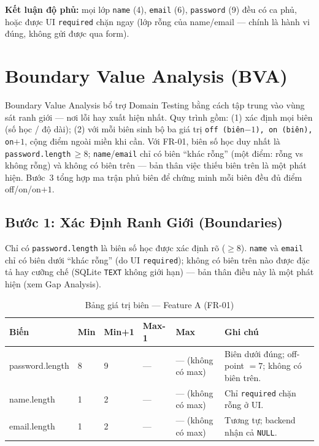 \documentclass[12pt, a4paper]{report}
\begin{document}
\noindent\textbf{Kết luận độ phủ:} mọi lớp \texttt{name} (4), \texttt{email} (6), \texttt{password}
(9) đều có ca phủ, hoặc được UI \texttt{required} chặn ngay (lớp rỗng của name/email --- chính là
hành vi đúng, không gửi được qua form).

\section{Boundary Value Analysis (BVA)}

Boundary Value Analysis bổ trợ Domain Testing bằng cách tập trung vào vùng sát ranh giới
--- nơi lỗi hay xuất hiện nhất. Quy trình gồm: (1) xác định mọi biên (số học /
độ dài); (2) với mỗi biên sinh bộ ba giá trị \texttt{off (biên$-1$), on (biên), on$+1$}, cộng
điểm ngoài miền khi cần. Với FR-01, biên số học duy nhất là \texttt{password.length}$\,\ge 8$;
\texttt{name}/\texttt{email} chỉ có biên ``khác rỗng'' (một điểm: rỗng vs không rỗng) và
không có biên trên --- bản thân việc thiếu biên trên là một phát hiện. Bước~3 tổng hợp ma
trận phủ biên để chứng minh mỗi biên đều đủ điểm off/on/on$+1$.

\subsection{Bước 1: Xác Định Ranh Giới (Boundaries)}
Chỉ có \texttt{password.length} là biên số học được xác định rõ ($\ge 8$). \texttt{name} và
\texttt{email} chỉ có biên dưới ``khác rỗng'' (do UI \texttt{required}); không có biên
trên nào được đặc tả hay cưỡng chế (SQLite \texttt{TEXT} không giới hạn) — bản thân điều này
là một phát hiện (xem Gap Analysis).

\begin{table}[H]
    \centering
    \caption{Bảng giá trị biên — Feature A (FR-01)}
    \begin{tabularx}{\linewidth}{L{3cm} C{1.6cm} C{1.6cm} C{1.8cm} C{2.4cm} X}
        \toprule
        \textbf{Biến} & \textbf{Min} & \textbf{Min+1} & \textbf{Max-1} & \textbf{Max} & \textbf{Ghi chú} \\
        \midrule
        password.length & 8 & 9 & --- & --- (không có max) & Biên dưới đúng; off-point $=7$; không có biên trên. \\
        name.length     & 1 & 2 & --- & --- (không có max) & Chỉ \texttt{required} chặn rỗng ở UI. \\
        email.length    & 1 & 2 & --- & --- (không có max) & Tương tự; backend nhận cả \texttt{NULL}. \\
        \bottomrule
    \end{tabularx}
\end{table}
\end{document}

